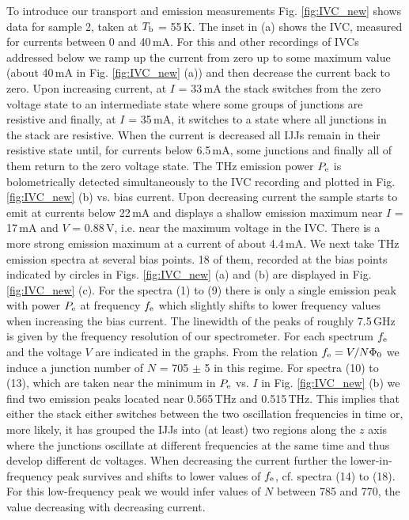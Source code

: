 \documentclass[aps,twocolumn,prb,showpacs,preprintnumbers,superscriptaddress,amsmath,amssymb,longbibliography]{revtex4-1}
\begin{document}
To introduce our transport and emission measurements Fig. \ref{fig:IVC_new} shows data for sample 2, taken at $T_{\rm b}$ = 55\,K. The inset in (a) shows the IVC, measured for currents between 0 and 40\,mA. For this and other recordings of IVCs addressed below we ramp up the current from zero up to some maximum value (about 40\,mA in Fig. \ref{fig:IVC_new} (a)) and then decrease the current back to zero. Upon increasing current, at $I$ = 33\,mA the stack switches from the zero voltage state to an intermediate state where some groups of junctions are resistive and finally, at $I$ = 35\,mA, it switches to a state where all junctions in the stack are resistive. When the current is decreased all IJJs remain in their resistive state until, for currents below 6.5\,mA, some junctions and finally all of them return to the zero voltage state. The THz emission power $P_{\rm e}$ is bolometrically detected simultaneously to the IVC recording and plotted in Fig. \ref{fig:IVC_new} (b) vs.  bias current. Upon decreasing current the sample starts to emit at currents below 22\,mA and displays a shallow emission maximum near $I$ = 17\,mA and $V$ = 0.88\,V, i.e. near the maximum voltage in the IVC. There is a more strong emission maximum at a current of about 4.4\,mA. We next take THz emission spectra at several bias points. 18 of them, recorded at the bias points indicated by circles in Figs. \ref{fig:IVC_new} (a) and (b) are displayed  in Fig. \ref{fig:IVC_new} (c). For the spectra (1) to (9) there is only a single emission peak with power $P_{\rm e}$ at frequency $f_{\rm e}$ which slightly shifts to lower frequency values when increasing the bias current. The linewidth of the peaks of roughly 7.5\,GHz is given by the frequency resolution of our spectrometer. For each spectrum $f_{\rm e}$ and the voltage $V$ are indicated in the graphs. From the relation $f_{\rm e} = V/N\Phi_0$ we induce a junction number of $N$ = 705 $\pm$ 5 in this regime. For spectra (10) to (13), which are taken near the minimum in $P_{\rm e}$ vs. $I$ in Fig. \ref{fig:IVC_new} (b) we find two emission peaks located near 0.565\,THz and 0.515\,THz. This implies that either the stack either switches between the two oscillation frequencies in time or, more likely, it has grouped the IJJs into (at least) two regions along the $z$ axis where the junctions oscillate at different frequencies at the same time and thus develop different dc voltages.  
When decreasing the current further the lower-in-frequency peak survives and shifts to lower values of $f_{\rm e}$, cf. spectra (14) to (18). For this 
low-frequency peak we would infer values of $N$ between 785 and 770, the value decreasing with decreasing current. 
\end{document}
